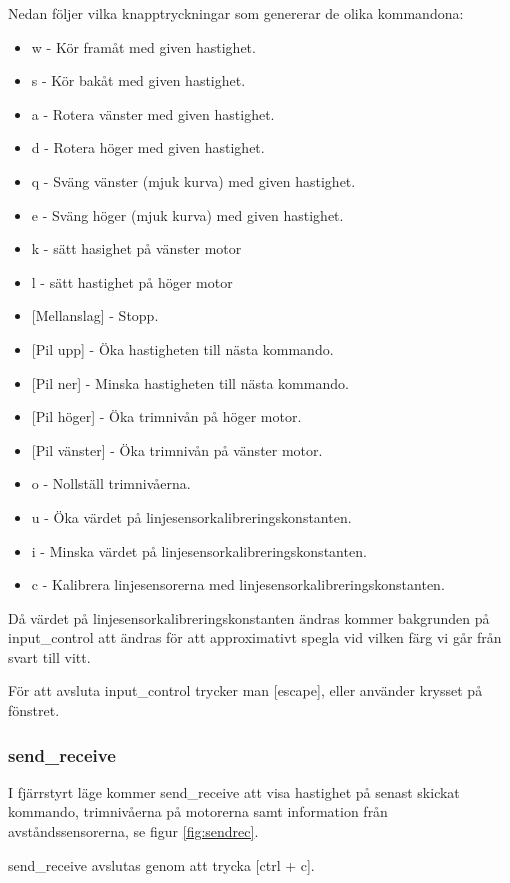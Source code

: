 Nedan följer vilka knapptryckningar som genererar de olika kommandona:

\begin{itemize}
\item w - Kör framåt med given hastighet.
\item s - Kör bakåt med given hastighet.
\item a - Rotera vänster med given hastighet.
\item d - Rotera höger med given hastighet.
\item q - Sväng vänster (mjuk kurva) med given hastighet.
\item e - Sväng höger (mjuk kurva) med given hastighet.
\item k - sätt hasighet på vänster motor
\item l - sätt hastighet på höger motor
\item {[}Mellanslag] - Stopp.

\item {[}Pil upp] - Öka hastigheten till nästa kommando.
\item {[}Pil ner] - Minska hastigheten till nästa kommando.

\item {[}Pil höger] - Öka trimnivån på höger motor.
\item {[}Pil vänster] - Öka trimnivån på vänster motor.
\item o - Nollställ trimnivåerna.

\item u - Öka värdet på linjesensorkalibreringskonstanten.
\item i - Minska värdet på linjesensorkalibreringskonstanten.
\item c - Kalibrera linjesensorerna med linjesensorkalibreringskonstanten.
\end{itemize}

Då värdet på linjesensorkalibreringskonstanten ändras kommer bakgrunden på
input\_control att ändras för att approximativt spegla vid vilken färg vi går
från svart till vitt.

För att avsluta input\_control trycker man [escape], eller använder krysset på
fönstret.

\subsubsection{send\_receive}
I fjärrstyrt läge kommer send\_receive att visa hastighet på senast skickat
kommando, trimnivåerna på motorerna samt information från avståndssensorerna, se
figur \ref{fig:sendrec}.

send\_receive avslutas genom att trycka [ctrl + c].

